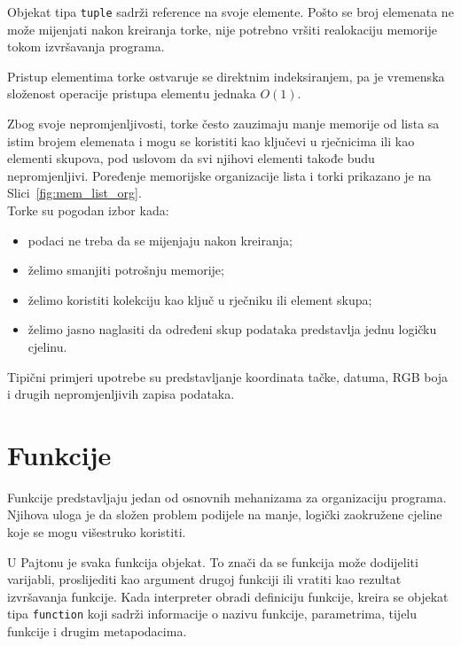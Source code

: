 Objekat tipa \texttt{tuple} sadrži reference na svoje elemente. Pošto se broj elemenata ne može mijenjati nakon kreiranja torke, nije potrebno vršiti realokaciju memorije tokom izvršavanja programa.

Pristup elementima torke ostvaruje se direktnim indeksiranjem, pa je vremenska složenost operacije pristupa elementu jednaka $O(1)$.

Zbog svoje nepromjenljivosti, torke često zauzimaju manje memorije od lista sa istim brojem elemenata i mogu se koristiti kao ključevi u rječnicima ili kao elementi skupova, pod uslovom da svi njihovi elementi takođe budu nepromjenljivi. Poređenje memorijske organizacije lista i torki prikazano je na Slici~\ref{fig:mem_list_org}.\\ 



Torke su pogodan izbor kada:

\begin{itemize}
	\item podaci ne treba da se mijenjaju nakon kreiranja;
	\item želimo smanjiti potrošnju memorije;
	\item želimo koristiti kolekciju kao ključ u rječniku ili element skupa;
	\item želimo jasno naglasiti da određeni skup podataka predstavlja jednu logičku cjelinu.
\end{itemize}

Tipični primjeri upotrebe su predstavljanje koordinata tačke, datuma, RGB boja i drugih nepromjenljivih zapisa podataka.

\section{Funkcije}

Funkcije predstavljaju jedan od osnovnih mehanizama za organizaciju programa. Njihova uloga je da složen problem podijele na manje, logički zaokružene cjeline koje se mogu višestruko koristiti.

U Pajtonu je svaka funkcija objekat. To znači da se funkcija može dodijeliti varijabli, proslijediti kao argument drugoj funkciji ili vratiti kao rezultat izvršavanja funkcije. Kada interpreter obradi definiciju funkcije, kreira se objekat tipa \texttt{function} koji sadrži informacije o nazivu funkcije, parametrima, tijelu funkcije i drugim metapodacima.


